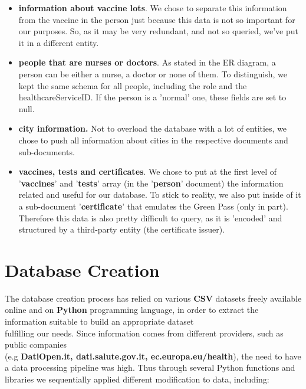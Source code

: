 \documentclass{article}[IEEEtran]
\begin{document}
\begin{itemize}
\item \textbf{information about vaccine lots}. We chose to separate this information from the vaccine in the person just because this data is not so important for our purposes. So, as it may be very redundant, and not so queried, we've put it in a different entity.
\item \textbf{people that are nurses or doctors}. As stated in the ER diagram, a person can be either a nurse, a doctor or none of them. To distinguish, we kept the same schema for all people, including the role and the healthcareServiceID. If the person is a 'normal' one, these fields are set to null.
\item \textbf{city information.} Not to overload the database with a lot of entities, we chose to push all information about cities in the respective documents and sub-documents.
\item \textbf{vaccines, tests and certificates}. We chose to put at the first level of '\textbf{vaccines}' and '\textbf{tests}' array (in the '\textbf{person}' document) the information related and useful for our database. To stick to reality, we also put inside of it a sub-document '\textbf{certificate}' that emulates the Green Pass (only in part). Therefore this data is also pretty difficult to query, as it is 'encoded' and structured by a third-party entity (the certificate issuer). 
\end{itemize}


\section{Database Creation}\label{sec:creation}

The database creation process has relied on various \textbf{CSV} datasets freely available online and on \textbf{Python}\cite{van1995python} programming language, in order to extract the information suitable to build an appropriate dataset \\ fulfilling our needs. Since information comes from different providers, such as public companies \\ (e.g \textbf{DatiOpen.it, dati.salute.gov.it, ec.europa.eu/health}), the need to have a data processing pipeline was high.
Thus through several Python functions and libraries we sequentially applied different modification to data, including:
\end{document}
